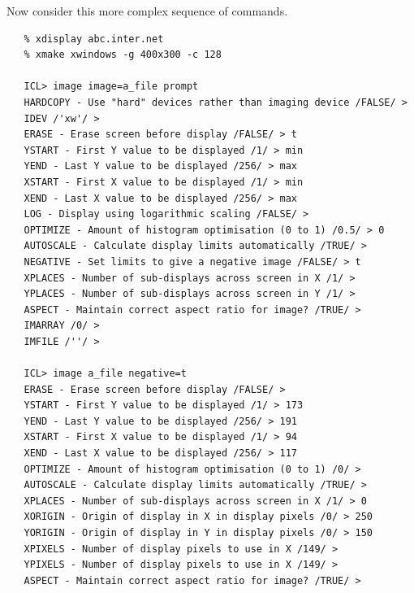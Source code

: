    Now consider this more complex sequence of commands.

\begin{verbatim}
   % xdisplay abc.inter.net
   % xmake xwindows -g 400x300 -c 128

   ICL> image image=a_file prompt
   HARDCOPY - Use "hard" devices rather than imaging device /FALSE/ >
   IDEV /'xw'/ >
   ERASE - Erase screen before display /FALSE/ > t
   YSTART - First Y value to be displayed /1/ > min
   YEND - Last Y value to be displayed /256/ > max
   XSTART - First X value to be displayed /1/ > min
   XEND - Last X value to be displayed /256/ > max
   LOG - Display using logarithmic scaling /FALSE/ >
   OPTIMIZE - Amount of histogram optimisation (0 to 1) /0.5/ > 0
   AUTOSCALE - Calculate display limits automatically /TRUE/ >
   NEGATIVE - Set limits to give a negative image /FALSE/ > t
   XPLACES - Number of sub-displays across screen in X /1/ >
   YPLACES - Number of sub-displays across screen in Y /1/ >
   ASPECT - Maintain correct aspect ratio for image? /TRUE/ >
   IMARRAY /0/ >
   IMFILE /''/ >

   ICL> image a_file negative=t
   ERASE - Erase screen before display /FALSE/ >
   YSTART - First Y value to be displayed /1/ > 173
   YEND - Last Y value to be displayed /256/ > 191
   XSTART - First X value to be displayed /1/ > 94
   XEND - Last X value to be displayed /256/ > 117
   OPTIMIZE - Amount of histogram optimisation (0 to 1) /0/ >
   AUTOSCALE - Calculate display limits automatically /TRUE/ >
   XPLACES - Number of sub-displays across screen in X /1/ > 0
   XORIGIN - Origin of display in X in display pixels /0/ > 250
   YORIGIN - Origin of display in Y in display pixels /0/ > 150
   XPIXELS - Number of display pixels to use in X /149/ >
   YPIXELS - Number of display pixels to use in X /149/ >
   ASPECT - Maintain correct aspect ratio for image? /TRUE/ >
\end{verbatim}

